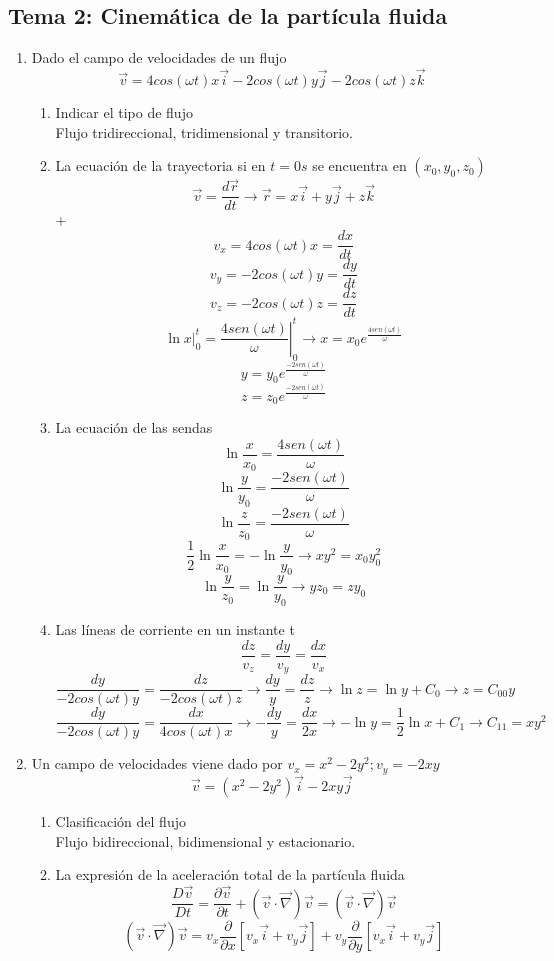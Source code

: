 \subsection{Tema 2: Cinemática de la partícula fluida}
\begin{enumerate}
	\item Dado el campo de velocidades de un flujo
	\[\vec{v}=4cos(\omega t)x\vec{i}-2cos(\omega t)y\vec{j}-2cos(\omega t)z\vec{k}\]
	\begin{enumerate}
		\item Indicar el tipo de flujo\\
		Flujo tridireccional, tridimensional y transitorio.
		\item La ecuación de la trayectoria si en $t=0s$ se encuentra en $(x_0,y_0,z_0)$
		\[\vec{v}=\frac{d\vec{r}}{dt} \rightarrow \vec{r}=x\vec{i}+y\vec{j}+z\vec{k}\]+
		\[v_x=4cos(\omega t)x=\frac{dx}{dt}\]
		\[v_y= -2cos(\omega t)y = \frac{dy}{dt}\]
		\[v_z= -2cos(\omega t)z = \frac{dz}{dt} \]
		\[\ln x|_0^t=\left.{\frac{4sen(\omega t)}{\omega}}\right |_0^t \rightarrow x=x_0 e^{\frac{4sen(\omega t)}{\omega}}\]
		\[y=y_0 e^{\frac{-2sen(\omega t)}{\omega}}\]
		\[z=z_0 e^{\frac{-2sen(\omega t)}{\omega}}\]
		\item La ecuación de las sendas
		\[\ln \frac{x}{x_0}=\frac{4sen(\omega t)}{\omega}\]
		\[\ln \frac{y}{y_0}=\frac{-2sen(\omega t)}{\omega}\]
		\[\ln \frac{z}{z_0}=\frac{-2sen(\omega t)}{\omega}\]
		\[\frac{1}{2}\ln \frac{x}{x_0}=-\ln \frac{y}{y_0} \rightarrow xy^2=x_0y_0^2\]
		\[\ln \frac{y}{z_0}=\ln \frac{y}{y_0} \rightarrow yz_0=zy_0\]
		\item Las líneas de corriente en un instante t
		\[\frac{dz}{v_z}=\frac{dy}{v_y}=\frac{dx}{v_x}\]
		\[\frac{dy}{-2cos(\omega t)y}=\frac{dz}{-2cos(\omega t)z}\rightarrow \frac{dy}{y}=\frac{dz}{z}\rightarrow \ln z = \ln y + C_0 \rightarrow z=C_{00}y\]
		\[\frac{dy}{-2cos(\omega t)y}=\frac{dx}{4cos(\omega t)x}\rightarrow -\frac{dy}{y}=\frac{dx}{2x}\rightarrow -\ln y = \frac{1}{2}\ln x + C_1 \rightarrow C_{11}=xy^2 \]
	\end{enumerate}
	\item Un campo de velocidades viene dado por $v_x=x^2-2y^2; v_y=-2xy$
	\[\vec{v}=(x^2-2y^2)\vec{i}-2xy\vec{j}\]
	\begin{enumerate}
		\item Clasificación del flujo\\
		Flujo bidireccional, bidimensional y estacionario.
		\item La expresión de la aceleración total de la partícula fluida
		\[\frac{D\vec{v}}{Dt}=\frac{\partial\vec{v}}{\partial t}+\left(\vec{v}\cdot\vec{\nabla}\right)\vec{v}=\left(\vec{v}\cdot\vec{\nabla}\right)\vec{v}\]
		\[\left(\vec{v}\cdot\vec{\nabla}\right)\vec{v}=v_x\frac{\partial}{\partial x}\left[v_x\vec{i}+v_y\vec{j}\right]+v_y\frac{\partial}{\partial y}\left[v_x\vec{i}+v_y\vec{j}\right]\]
		

\end{enumerate}
\end{enumerate}
